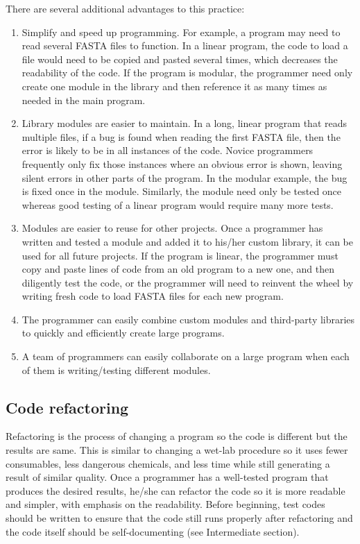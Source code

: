 \documentclass[ChapterTOCs,krantz2]{krantz} %
\begin{document}
There are several additional advantages to this practice:  
\begin{enumerate}

\item Simplify and speed up programming.  For example, a program may need to read
several FASTA files to function.  In a linear program, the
code to load a file would need to be copied and pasted several times,
which decreases the readability of the code.  If the program is modular, the
programmer need only create one module in the library and then reference it as
many times as needed in the main program.  

\item Library modules are easier to maintain.  
In a long, linear program that reads multiple files, if a bug is found when
reading the first FASTA file, then the error is likely to be in all instances
of the code.  Novice programmers frequently only fix those
instances where an obvious error is shown, leaving silent errors in other parts
of the program.  In the modular example, the bug is fixed once in the module.  
Similarly, the module need only be
tested once whereas good testing of a linear program would require many more
tests.

\item Modules are
easier to reuse for other projects.  Once a programmer has written and tested a
module and added it to his/her custom library, it
can be used for all future projects.  If the program is linear, the programmer
must copy and paste lines of code from an old program to a new one, and then
diligently test the code, or the
programmer will need to reinvent the wheel by writing fresh code to load FASTA
files for each new program.  

\item The programmer can easily combine custom
modules and third-party libraries to quickly and efficiently create large
programs.  

\item A team of programmers can easily collaborate on a large
program when each of them is writing/testing different modules.  

\end{enumerate}


\subsection{Code refactoring}

Refactoring is the process of changing a program so the code is different but
the results are same.  This is similar to changing a wet-lab procedure  
so it uses fewer consumables, less dangerous chemicals, and less time while still
generating a result of similar quality.  Once a programmer has a
well-tested program that produces the desired results, he/she can refactor the
code so it is more readable and simpler, with emphasis on the readability.
Before beginning, test codes should be written to ensure that the code still
runs properly after refactoring and the code itself should be self-documenting
(see Intermediate section). 
\end{document}
